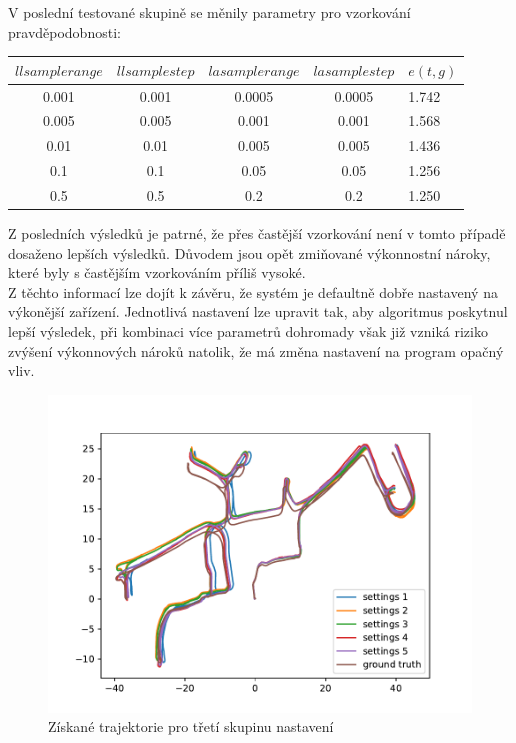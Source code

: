 \documentclass[12pt]{report}
\begin{document}
\noindent V poslední testované skupině se měnily parametry pro vzorkování pravděpodobnosti:
\begin{center}
	\begin{tabular}{cccc|p{1.5cm}}
		\bfseries $llsamplerange$  & \bfseries $llsamplestep$ & \bfseries $lasamplerange$ & \bfseries $lasamplestep$ & $e(t,g)$ \\ [2mm]
		\hline
		0.001 & 0.001 & 0.0005 & 0.0005 & 1.742 \\
		0.005 & 0.005 & 0.001 & 0.001 & 1.568 \\ 
		0.01 & 0.01 & 0.005 & 0.005 & 1.436 \\ 
		0.1 & 0.1 & 0.05 & 0.05 & 1.256 \\
		0.5 & 0.5 & 0.2 & 0.2 & 1.250\\
	\end{tabular}
\end{center}
Z posledních výsledků je patrné, že přes častější vzorkování není v tomto případě dosaženo lepších výsledků. Důvodem jsou opět zmiňované výkonnostní nároky, které byly s častějším vzorkováním příliš vysoké.\\
\indent Z těchto informací lze dojít k závěru, že systém je defaultně dobře nastavený na výkonější zařízení. Jednotlivá nastavení lze upravit tak, aby algoritmus poskytnul lepší výsledek, při kombinaci více parametrů dohromady však již vzniká riziko zvýšení výkonnových nároků natolik, že má změna nastavení na program opačný vliv.

\begin{figure}[!ht]
	\begin{center}
		\includegraphics[width=0.67\columnwidth]{imgs/gmapping3.pdf}
	\end{center}
	\caption{Získané trajektorie pro třetí skupinu nastavení}
	\label{fig:gmapping3}
\end{figure}

\newpage
\end{document}
